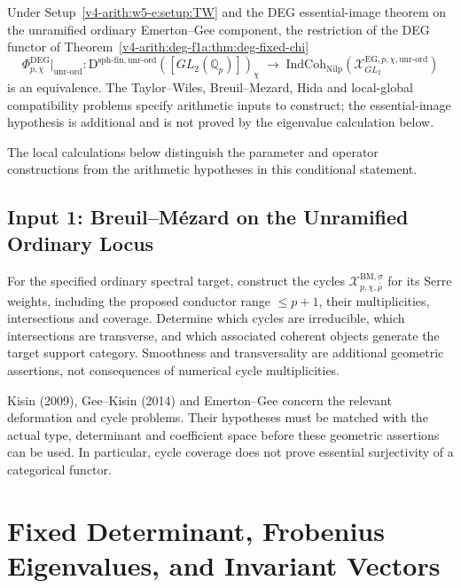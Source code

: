 \begin{theorem}
\label{v4-arith:w5-e:thm:f1a1-ordinary}
\ClaimStatusProvedHereConditional Under Setup~\ref{v4-arith:w5-e:setup:TW}
and the DEG essential-image theorem on the unramified ordinary
Emerton--Gee component, the
restriction of the DEG functor of
Theorem~\ref{v4-arith:deg-f1a:thm:deg-fixed-chi}
\[
\Phi^{\mathrm{DEG}}_{p,\chi}\bigr|_{\mathrm{unr\text{-}ord}}\colon
\mathrm{D}^{\mathrm{sph\text{-}fin,unr\text{-}ord}}([GL_{2}(\mathbb{Q}_{p})])_{\chi}
\;\longrightarrow\;
\mathrm{IndCoh}_{\mathrm{Nilp}}(\mathcal{X}^{\mathrm{EG},p,\chi,\mathrm{unr\text{-}ord}}_{GL_{2}})
\]
is an equivalence. The Taylor--Wiles, Breuil--Mezard, Hida and
local-global compatibility problems specify arithmetic inputs to
construct; the essential-image hypothesis is additional and is not
proved by the eigenvalue calculation below.
\end{theorem}

The local calculations below distinguish the parameter and operator constructions from the arithmetic hypotheses in this conditional statement.

\subsection{Input 1: Breuil--M{\'e}zard on the Unramified Ordinary Locus}
\begin{conjecture}
\label{v4-arith:w5-e:lem:BM-unr-ord}
For the specified ordinary spectral target, construct the cycles
$\mathcal X^{\mathrm{BM},\sigma}_{p,\chi,\bar\rho}$ for its Serre weights,
including the proposed conductor range $\le p+1$, their multiplicities,
intersections and coverage. Determine which cycles are irreducible,
which intersections are transverse, and which associated coherent
objects generate the target support category. Smoothness and
transversality are additional geometric assertions, not consequences
of numerical cycle multiplicities.
\end{conjecture}
Kisin (2009), Gee--Kisin (2014) and Emerton--Gee concern the relevant
deformation and cycle problems. Their hypotheses must be matched with
the actual type, determinant and coefficient space before these
geometric assertions can be used. In particular, cycle coverage does
not prove essential surjectivity of a categorical functor.
\section{Fixed Determinant, Frobenius Eigenvalues, and Invariant Vectors}

